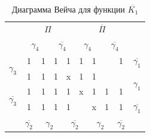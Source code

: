 \documentclass[a4paper,14pt]{article}
\begin{document}
\begin{table}[H]
	\begin{center}
		\caption{\label{tab:dvKorrNK1} Диаграмма Вейча для функции $\overline{K_1}$}
	\begin{tabular}{cccccccccc}
		& \multicolumn{4}{c}{$\Pi$}                                                                             & \multicolumn{4}{c}{$\overline{\Pi}$}                                                                            &                     \\
		& \multicolumn{2}{c}{$\gamma_4$}                          & \multicolumn{2}{c}{$\overline{\gamma_4}$}                         & \multicolumn{2}{c}{$\gamma_4$}                          & \multicolumn{2}{c}{$\overline{\gamma_4}$}                         &                     \\ \cline{2-9}
		\multicolumn{1}{c|}{\multirow{2}{*}{$\gamma_3$}}  & \multicolumn{1}{c|}{1} & \multicolumn{1}{c|}{1} & \multicolumn{1}{c|}{1} & \multicolumn{1}{c|}{1} & \multicolumn{1}{c|}{1} & \multicolumn{1}{c|}{1} & \multicolumn{1}{c|}{}  & \multicolumn{1}{c|}{1} &       $\overline{\gamma_1}$           \\ \cline{2-9}
		\multicolumn{1}{c|}{}                     & \multicolumn{1}{c|}{1} & \multicolumn{1}{c|}{1} & \multicolumn{1}{c|}{1} & \multicolumn{1}{c|}{x} & \multicolumn{1}{c|}{1} & \multicolumn{1}{c|}{1} & \multicolumn{1}{c|}{}  & \multicolumn{1}{c|}{}  & \multirow{2}{*}{$\gamma_1$} \\ \cline{2-9}
		\multicolumn{1}{c|}{\multirow{2}{*}{$\overline{\gamma_3}$}} & \multicolumn{1}{c|}{1} & \multicolumn{1}{c|}{1} & \multicolumn{1}{c|}{1} & \multicolumn{1}{c|}{1} & \multicolumn{1}{c|}{x} & \multicolumn{1}{c|}{1} & \multicolumn{1}{c|}{1} & \multicolumn{1}{c|}{1} &                     \\ \cline{2-9}
		\multicolumn{1}{c|}{}                     & \multicolumn{1}{c|}{1} & \multicolumn{1}{c|}{1} & \multicolumn{1}{c|}{1} & \multicolumn{1}{c|}{1} & \multicolumn{1}{c|}{}  & \multicolumn{1}{c|}{x} & \multicolumn{1}{c|}{1} & \multicolumn{1}{c|}{1} & $\overline{\gamma_1}$                 \\ \cline{2-9}
		& $\overline{\gamma_2}$                    & \multicolumn{2}{c}{$\gamma_2$}                          & \multicolumn{2}{c}{$\overline{\gamma_2}$}                         & \multicolumn{2}{c}{$\gamma_2$}                          & $\overline{\gamma_2}$                    &                    
	\end{tabular}
\end{center}
\end{table}
\end{document}
